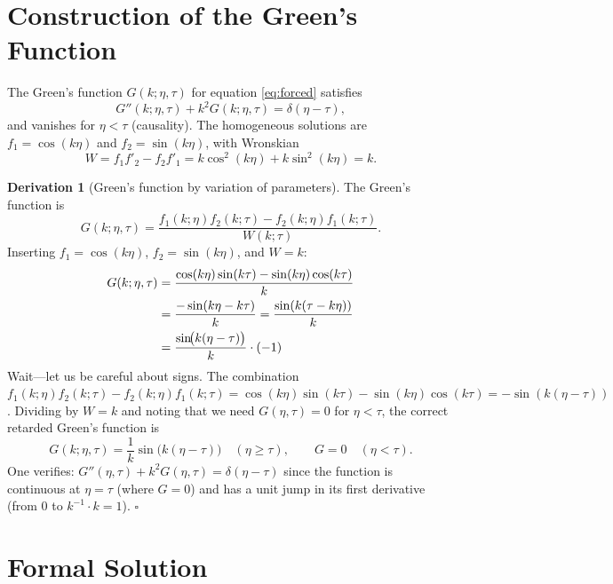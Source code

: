 \documentclass[12pt,a4paper]{report}
\theoremstyle{definition}
\newtheorem{derivation}{Derivation}[chapter]
\begin{document}
\section{Construction of the Green's Function}

The Green's function $G(k;\eta,\tau)$ for equation \eqref{eq:forced} satisfies
\begin{equation}
  G''(k;\eta,\tau) + k^2 G(k;\eta,\tau) = \delta(\eta-\tau),
  \label{eq:GF_def}
\end{equation}
and vanishes for $\eta<\tau$ (causality). The homogeneous solutions are $f_1=\cos(k\eta)$
and $f_2=\sin(k\eta)$, with Wronskian
\begin{equation}
  W = f_1 f'_2 - f_2 f'_1 = k\cos^2(k\eta)+k\sin^2(k\eta) = k.
\end{equation}

\begin{derivation}[Green's function by variation of parameters]
The Green's function is
\begin{equation}
  G(k;\eta,\tau) = \frac{f_1(k;\eta)f_2(k;\tau) - f_2(k;\eta)f_1(k;\tau)}{W(k;\tau)}.
\end{equation}
Inserting $f_1=\cos(k\eta)$, $f_2=\sin(k\eta)$, and $W=k$:
\begin{align}
  G(k;\eta,\tau)
  &= \frac{\cos(k\eta)\sin(k\tau) - \sin(k\eta)\cos(k\tau)}{k} \notag\\
  &= \frac{-\sin(k\eta - k\tau)}{k}
   = \frac{\sin(k(\tau-k\eta))}{k} \notag\\
  &= \frac{\sin\!\bigl(k(\eta-\tau)\bigr)}{k}\cdot(-1)
\end{align}
Wait---let us be careful about signs. The combination
$f_1(k;\eta)f_2(k;\tau)-f_2(k;\eta)f_1(k;\tau)
=\cos(k\eta)\sin(k\tau)-\sin(k\eta)\cos(k\tau)
=-\sin(k(\eta-\tau))$.
Dividing by $W=k$ and noting that we need $G(\eta,\tau)=0$ for $\eta<\tau$,
the correct retarded Green's function is
\begin{equation}
  G(k;\eta,\tau) = \frac{1}{k}\sin\!\bigl(k(\eta-\tau)\bigr)
  \quad (\eta\geq\tau), \qquad G=0 \quad(\eta<\tau).
  \label{eq:GF}
\end{equation}
One verifies: $G''(\eta,\tau)+k^2 G(\eta,\tau) = \delta(\eta-\tau)$ since
the function is continuous at $\eta=\tau$ (where $G=0$) and has a unit jump in
its first derivative (from 0 to $k^{-1}\cdot k = 1$). $\square$
\end{derivation}

\section{Formal Solution}
\end{document}
